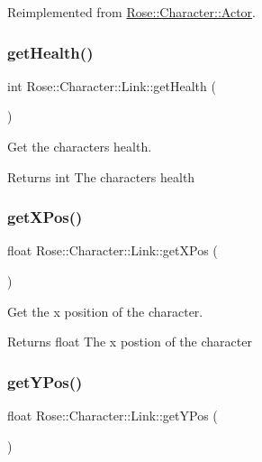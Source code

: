 Reimplemented from \mbox{\hyperlink{classRose_1_1Character_1_1Actor_a1433ef76e892a8c57597115071c256d8}{Rose\+::\+Character\+::\+Actor}}.

\mbox{\label{classRose_1_1Character_1_1Link_a75a15e36178c1b7bc84bec5f969d3369}} 
\subsubsection{\texorpdfstring{getHealth()}{getHealth()}}
{\footnotesize\ttfamily int Rose\+::\+Character\+::\+Link\+::get\+Health (\begin{DoxyParamCaption}{ }\end{DoxyParamCaption})}



Get the characters health. 

\begin{DoxyReturn}{Returns}
int The characters health 
\end{DoxyReturn}
\mbox{\label{classRose_1_1Character_1_1Link_a9ea9b1c4b96926fb066a3729102a249d}} 
\subsubsection{\texorpdfstring{getXPos()}{getXPos()}}
{\footnotesize\ttfamily float Rose\+::\+Character\+::\+Link\+::get\+X\+Pos (\begin{DoxyParamCaption}{ }\end{DoxyParamCaption})}



Get the x position of the character. 

\begin{DoxyReturn}{Returns}
float The x postion of the character 
\end{DoxyReturn}
\mbox{\label{classRose_1_1Character_1_1Link_aa9ca41c35449ee5cb0c5b666f5f57b9b}} 
\subsubsection{\texorpdfstring{getYPos()}{getYPos()}}
{\footnotesize\ttfamily float Rose\+::\+Character\+::\+Link\+::get\+Y\+Pos (\begin{DoxyParamCaption}{ }\end{DoxyParamCaption})}



